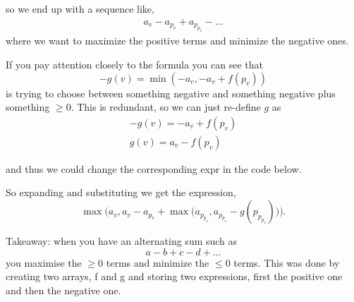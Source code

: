 so we end up with a sequence like,
\begin{align*}
    a_v - a_{p_v} + a_{p_{p_v}} - \dots 
\end{align*}
where we want to maximize the positive terms and minimize the negative ones.

\begin{obs}
    If you pay attention closely to the formula you can see that 
    \begin{equation}
        -g(v) = \min(-a_v, -a_v + f(p_v))
    \end{equation}
    is trying to choose between something negative and something negative plus something $\geq 0 $. This is redundant, so we can just re-define $g$ as
    \begin{equation}
    \begin{matrix}
        -g(v) = -a_v + f(p_v) \\
        g(v) = a_v - f(p_v) 
    \end{matrix}
    \end{equation}

    and thus we could change the corresponding expr in the code below.

    So expanding and substituting we get the expression,
    \begin{equation}
        \max\Big(a_v, a_v - a_{p_v} + \max\big(a_{p_{p_v}}, a_{p_{p_v}} - g(p_{p_{p_v}}) \big) \Big).
    \end{equation}
\end{obs}

\begin{obs}
    Takeaway: when you have an alternating sum such as
    \begin{equation}
        a -b+c-d+\dots
    \end{equation}
    you maximise the $\geq 0$ terms and minimize the $\leq 0$ terms.
    This was done by creating two arrays, f and g and storing two expressions, first the positive one and then the negative one.
\end{obs}

